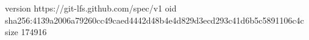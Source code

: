 version https://git-lfs.github.com/spec/v1
oid sha256:4139a2006a79260cc49caed4442d48b4e4d829d3ecd293c41d6b5c5891106c4c
size 174916
